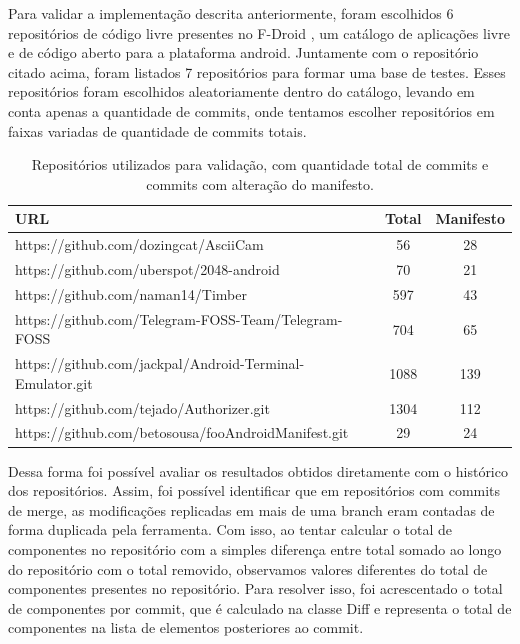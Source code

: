 \documentclass[a4paper,12pt]{article}
\begin{document}
Para validar a implementação descrita anteriormente, foram escolhidos 6 repositórios de código livre presentes no F-Droid \cite{fdroid}, um catálogo de aplicações livre e de código aberto para a plataforma android. Juntamente com o repositório citado acima, foram listados 7 repositórios para formar uma base de testes. Esses repositórios foram escolhidos aleatoriamente dentro do catálogo, levando em conta apenas a quantidade de commits, onde tentamos escolher repositórios em faixas variadas de quantidade de commits totais.


\begin{table}[h]
\begin{center}
\begin{tabular}{l|c|c}

 URL & Total & Manifesto\\
\hline
https://github.com/dozingcat/AsciiCam & 56 & 28 \\
https://github.com/uberspot/2048-android & 70 & 21 \\
https://github.com/naman14/Timber & 597 & 43 \\
https://github.com/Telegram-FOSS-Team/Telegram-FOSS & 704 & 65 \\
https://github.com/jackpal/Android-Terminal-Emulator.git & 1088 & 139 \\
https://github.com/tejado/Authorizer.git & 1304 & 112 \\
https://github.com/betosousa/fooAndroidManifest.git & 29 & 24
\end{tabular}
\caption{Repositórios utilizados para validação, com quantidade total de commits e commits com alteração do manifesto.}
\end{center}
\end{table}


Dessa forma foi possível avaliar os resultados obtidos diretamente com o histórico dos repositórios. Assim, foi possível identificar que em repositórios com commits de merge, as modificações replicadas em mais de uma branch eram contadas de forma duplicada pela ferramenta. Com isso, ao tentar calcular o total de componentes no repositório com a simples diferença entre total somado ao longo do repositório com o total removido, observamos valores diferentes do total de componentes presentes no repositório.  Para resolver isso, foi acrescentado o total de componentes por commit, que é calculado na classe Diff e representa o total de componentes na lista de elementos posteriores ao commit.
\end{document}
